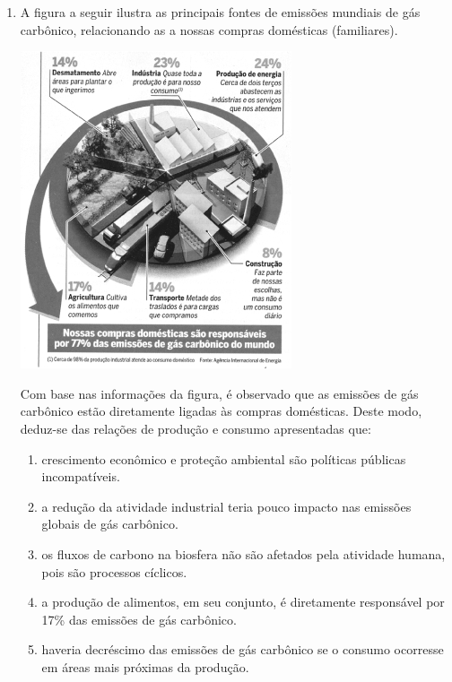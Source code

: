 \documentclass[10pt,a4paper]{article}
\newenvironment{Figure}
  {\par\medskip\noindent\minipage{\linewidth}}
  {\endminipage\par\medskip}
\begin{document}
\begin{multicols}{2}
\begin{enumerate}
\pagebreak

	\item A figura a seguir ilustra as principais fontes de emiss\~oes mundiais de g\'as carb\^onico, relacionando as a nossas compras dom\'esticas (familiares).

\begin{Figure}
     \includegraphics[width=\linewidth]{poluicao_consumo_bio.jpg}
\end{Figure}

Com base nas informa\c{c}\~oes da figura, \'e observado que as emiss\~oes de g\'as carb\^onico est\~ao diretamente ligadas \`as compras dom\'esticas. Deste modo, deduz-se das rela\c{c}\~oes de produ\c{c}\~ao e consumo apresentadas que:

		\begin{enumerate}
		\item  crescimento econ\^omico e prote\c{c}\~ao ambiental s\~ao pol\'iticas p\'ublicas incompat\'iveis.
		\item a redu\c{c}\~ao da atividade industrial teria pouco impacto nas emiss\~oes globais de g\'as carb\^onico.
		\item os fluxos de carbono na biosfera n\~ao s\~ao afetados pela atividade humana, pois s\~ao processos c\'iclicos.
		\item a produ\c{c}\~ao de alimentos, em seu conjunto, \'e diretamente respons\'avel por 17\% das emiss\~oes de g\'as carb\^onico.
		\item haveria decr\'escimo das emiss\~oes de g\'as carb\^onico se o consumo ocorresse em \'areas mais pr\'oximas da produ\c{c}\~ao. 
		\end{enumerate}




\end{enumerate}
\end{multicols}
\end{document}

